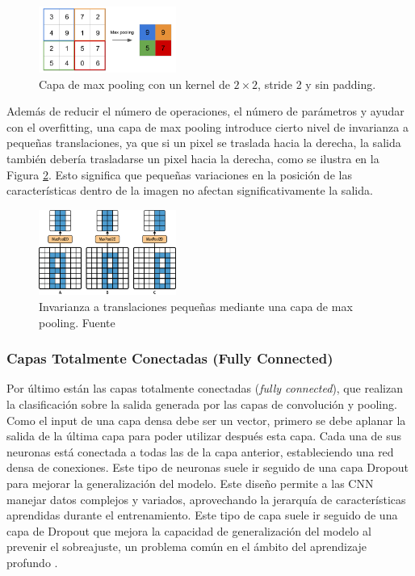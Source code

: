 \begin{figure}[h!]
\centering
\includegraphics[width=0.4\textwidth]{img/maxpooling.png}
\caption{Capa de max pooling con un kernel de \( 2 \times 2 \), stride 2 y sin padding.}
\label{fig:maxpooling}
\end{figure}

Además de reducir el número de operaciones, el número de parámetros y ayudar con el overfitting, una capa de max pooling introduce cierto nivel de invarianza a pequeñas translaciones, ya que si un pixel se traslada hacia la derecha, la salida también debería trasladarse un pixel hacia la derecha, como se ilustra en la Figura \ref{fig:translacionPooling}. Esto significa que pequeñas variaciones en la posición de las características dentro de la imagen no afectan significativamente la salida.


\begin{figure}[h!]
\centering
\includegraphics[width=0.4\textwidth]{img/translacionPooling.png}
\caption{Invarianza a translaciones pequeñas mediante una capa de max pooling. Fuente \citep{geron2022hands}}
\label{fig:translacionPooling}
\end{figure}



\subsubsection*{Capas Totalmente Conectadas (Fully Connected)}

Por último están las capas totalmente conectadas (\textit{fully connected}), que realizan la clasificación sobre la salida generada por las capas de convolución y pooling. Como el input de una capa densa debe ser un vector, primero se debe aplanar la salida de la última capa para poder utilizar después esta capa. Cada una de sus neuronas está conectada a todas las de la capa anterior, estableciendo una red densa de conexiones. Este tipo de neuronas suele ir seguido de una capa Dropout para mejorar la generalización del modelo. Este diseño permite a las CNN manejar datos complejos y variados, aprovechando la jerarquía de características aprendidas durante el entrenamiento. Este tipo de capa suele ir seguido de una capa de Dropout que mejora la capacidad de generalización del modelo al prevenir el sobreajuste, un problema común en el ámbito del aprendizaje profundo \citep{hossain2019classification}.


